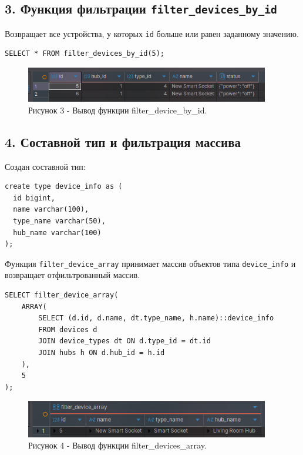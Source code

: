 \documentclass[oneside,a4paper,14pt]{extarticle}
\begin{document}
\subsection*{3. Функция фильтрации \texttt{filter\_devices\_by\_id}}

Возвращает все устройства, у которых \texttt{id} больше или равен заданному значению.

\begin{verbatim}
SELECT * FROM filter_devices_by_id(5);
\end{verbatim}

\begin{figure}[H]
  \centering
  \includegraphics[width=0.95\textwidth]{pics/filter_devices_by_id.png}
  \caption*{Рисунок 3 - Вывод функции filter\_device\_by\_id.}
\end{figure}

\subsection*{4. Составной тип и фильтрация массива}

Создан составной тип:
\begin{verbatim}
create type device_info as (
  id bigint,
  name varchar(100),
  type_name varchar(50),
  hub_name varchar(100)
);
\end{verbatim}

Функция \texttt{filter\_device\_array} принимает массив объектов типа \texttt{device\_info} и возвращает отфильтрованный массив.

\begin{verbatim}
SELECT filter_device_array(
    ARRAY(
        SELECT (d.id, d.name, dt.type_name, h.name)::device_info
        FROM devices d
        JOIN device_types dt ON d.type_id = dt.id
        JOIN hubs h ON d.hub_id = h.id
    ),
    5
);
\end{verbatim}

\begin{figure}[H]
  \centering
  \includegraphics[width=0.95\textwidth]{pics/filter_device_array.png}
  \caption*{Рисунок 4 - Вывод функции filter\_devices\_array.}
\end{figure}
\end{document}

